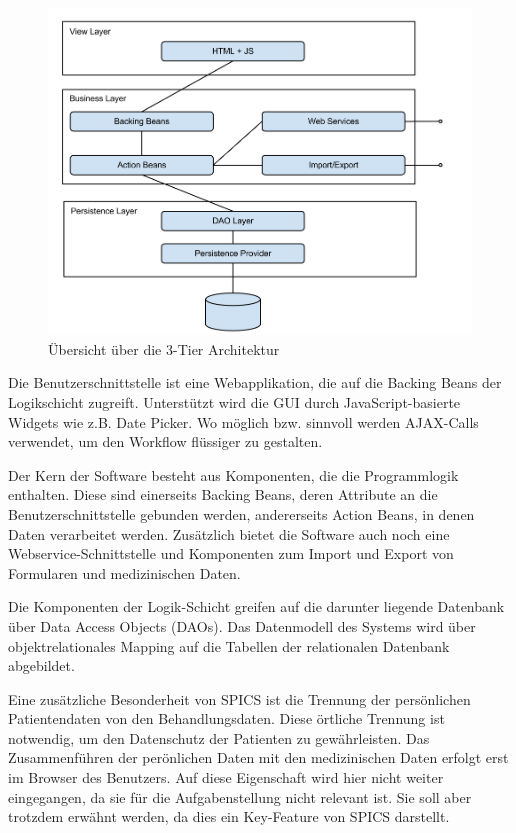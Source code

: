 \begin{figure}[h]
\begin{center}
\includegraphics[scale=0.4]{figures/spics_architektur_neu}
\caption{Übersicht über die 3-Tier Architektur}

\label{abb_spics_architektur}
\end{center}
\end{figure}

Die Benutzerschnittstelle ist eine Webapplikation, die auf die Backing Beans der Logikschicht zugreift. Unterstützt wird die GUI durch Java\-Script-basierte Widgets wie z.B. Date Picker. Wo möglich bzw. sinnvoll werden AJAX-Calls verwendet, um den Workflow flüssiger zu gestalten.

Der Kern der Software besteht aus Komponenten, die die Programmlogik enthalten. Diese sind einerseits Backing Beans, deren Attribute an die Benutzerschnittstelle gebunden werden, andererseits Action Beans, in denen Daten verarbeitet werden. Zu\-sätz\-lich bietet die Software auch noch eine Webservice-Schnittstelle und Komponenten zum Import und Export von Formularen und medizinischen Daten.

Die Komponenten der Logik-Schicht greifen auf die darunter liegende Datenbank über Data Access Objects (DAOs). Das Datenmodell des Systems wird über objektrelationales Mapping auf die Tabellen der relationalen Datenbank abgebildet.



Eine zusätzliche Besonderheit von SPICS ist die Trennung der persönlichen Patientendaten von den Behandlungsdaten. Diese örtliche Trennung ist not\-wen\-dig, um den Datenschutz der Patienten zu gewährleisten. Das Zusammenführen der perönlichen Daten mit den medizinischen Daten erfolgt erst im Browser des Benutzers. Auf diese Eigenschaft wird hier nicht weiter eingegangen, da sie für die Aufgabenstellung nicht relevant ist. Sie soll aber trotzdem erwähnt werden, da dies ein Key-Feature von SPICS darstellt.

